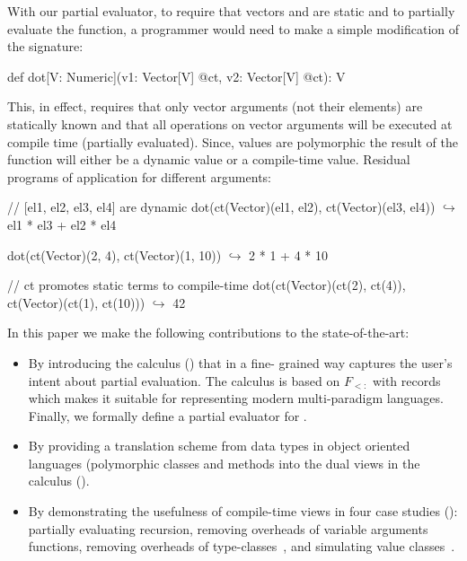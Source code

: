 With our partial evaluator, to require that vectors  and  are
 static and to partially evaluate the function, a programmer would need to make
 a simple modification of the  signature:

\vspace{1.8mm}
\begin{listing}
  def dot[V: Numeric](v1: Vector[V] @ct, v2: Vector[V] @ct): V
\end{listing}
\vspace{1.8mm}

This, in effect, requires that only vector arguments (not their elements) are
 statically known and that all operations on vector arguments will be executed
 at compile time (partially evaluated). Since, values are polymorphic the result
 of the function will either be a dynamic value or a compile-time value. Residual
 programs of  application for different arguments:

\vspace{1.8mm}
\begin{listing}[mathescape]
  // [el1, el2, el3, el4] are dynamic
  dot(ct(Vector)(el1, el2), ct(Vector)(el3, el4))
    $\hookrightarrow$ el1 * el3 + el2 * el4

  dot(ct(Vector)(2, 4), ct(Vector)(1, 10))
    $\hookrightarrow$ 2 * 1 + 4 * 10

  // ct promotes static terms to compile-time
  dot(ct(Vector)(ct(2), ct(4)), ct(Vector)(ct(1), ct(10)))
    $\hookrightarrow$ 42
\end{listing}
\vspace{1.8mm}

In this paper we make the following contributions to the state-of-the-art:
\begin{itemize}

 \item By introducing the \calculus calculus () that in a fine-
 grained way captures the user's intent about partial evaluation. The calculus
 is based on $F_{<:}$ with records which makes it suitable for representing
 modern multi-paradigm languages. Finally, we formally define a partial
 evaluator for \calculus.

 \item By providing a translation scheme from data types in object oriented languages (polymorphic  classes and methods into the dual views in the \calculus calculus ().

 \item By demonstrating the usefulness of compile-time views in four case
 studies (): partially evaluating recursion, removing
 overheads of variable arguments functions, removing overheads of
 type-classes~\cite{oliveira2010type}, and simulating value classes~\cite{value-classes}.

\end{itemize}

